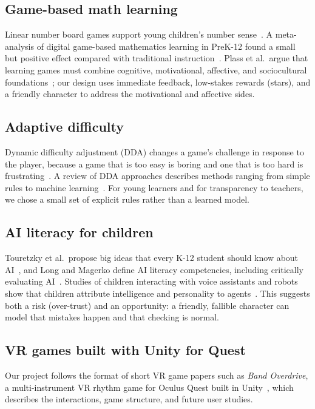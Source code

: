 \documentclass[conference]{IEEEtran}
\begin{document}
\subsection{Game-based math learning}
Linear number board games support young children's number sense~\cite{siegler2008}. A meta-analysis of digital game-based mathematics learning in PreK-12 found a small but positive effect compared with traditional instruction~\cite{tokac2019}. Plass et al.\ argue that learning games must combine cognitive, motivational, affective, and sociocultural foundations~\cite{plass2015}; our design uses immediate feedback, low-stakes rewards (stars), and a friendly character to address the motivational and affective sides.

\subsection{Adaptive difficulty}
Dynamic difficulty adjustment (DDA) changes a game's challenge in response to the player, because a game that is too easy is boring and one that is too hard is frustrating~\cite{hunicke2005}. A review of DDA approaches describes methods ranging from simple rules to machine learning~\cite{zohaib2018}. For young learners and for transparency to teachers, we chose a small set of explicit rules rather than a learned model.

\subsection{AI literacy for children}
Touretzky et al.\ propose big ideas that every K-12 student should know about AI~\cite{touretzky2019}, and Long and Magerko define AI literacy competencies, including critically evaluating AI~\cite{long2020}. Studies of children interacting with voice assistants and robots show that children attribute intelligence and personality to agents~\cite{druga2017}. This suggests both a risk (over-trust) and an opportunity: a friendly, fallible character can model that mistakes happen and that checking is normal.

\subsection{VR games built with Unity for Quest}
Our project follows the format of short VR game papers such as \emph{Band Overdrive}, a multi-instrument VR rhythm game for Oculus Quest built in Unity~\cite{wang2022}, which describes the interactions, game structure, and future user studies.
\end{document}
